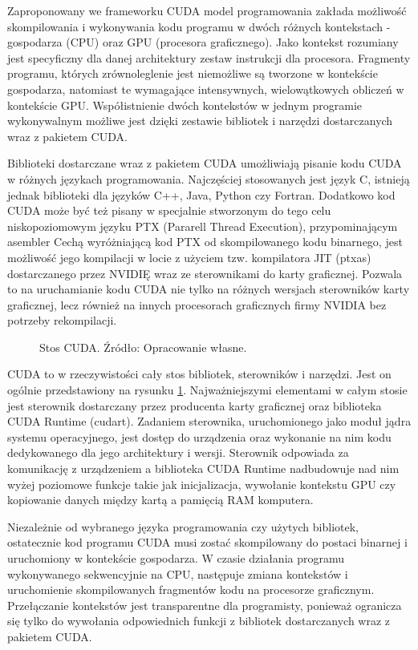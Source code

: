 Zaproponowany we frameworku CUDA model programowania zakłada możliwość
skompilowania i wykonywania kodu programu w dwóch różnych kontekstach -
gospodarza (CPU) oraz GPU (procesora graficznego)\cite{Nvi11b}. Jako kontekst rozumiany jest
specyficzny dla danej architektury zestaw instrukcji dla procesora. Fragmenty
programu, których zrównoleglenie jest niemożliwe są tworzone w kontekście
gospodarza,
	natomiast te wymagające intensywnych, wielowątkowych obliczeń w kontekście
	GPU.  Współistnienie dwóch kontekstów w jednym programie wykonywalnym
	możliwe jest dzięki zestawie bibliotek i narzędzi dostarczanych wraz z
	pakietem CUDA.

Biblioteki dostarczane wraz z pakietem CUDA umożliwiają pisanie kodu CUDA w różnych
językach programowania. Najczęściej stosowanych jest język C, istnieją jednak biblioteki
dla języków C++, Java, Python czy Fortran. Dodatkowo kod CUDA może być też pisany w specjalnie stworzonym do tego celu
niskopoziomowym języku PTX (Pararell Thread Execution), przypominającym
asembler
Cechą wyróżniającą kod PTX od skompilowanego kodu binarnego, jest możliwość jego
kompilacji w locie z użyciem tzw. kompilatora JIT (ptxas) dostarczanego przez
NVIDIĘ wraz ze sterownikami do karty graficznej. Pozwala to na uruchamianie kodu
CUDA nie tylko na różnych wersjach sterowników karty graficznej, lecz również na
innych procesorach graficznych firmy NVIDIA bez potrzeby rekompilacji\cite{isa}.

\begin{figure}[ht]
\centering

\caption{Stos CUDA. Źródło: Opracowanie własne.}
\label{cuda-model}
\end{figure}

CUDA to w rzeczywistości cały stos bibliotek, sterowników i narzędzi. Jest on
ogólnie 
przedstawiony na rysunku \ref{cuda-model}. Najważniejszymi elementami w całym
stosie jest sterownik dostarczany przez producenta karty graficznej
oraz biblioteka CUDA Runtime (cudart). Zadaniem sterownika, uruchomionego
jako moduł jądra systemu operacyjnego, jest dostęp do urządzenia oraz wykonanie
na nim kodu dedykowanego dla jego architektury i wersji. Sterownik odpowiada za
komunikację z urządzeniem a biblioteka CUDA Runtime nadbudowuje nad nim wyżej
poziomowe funkcje takie jak inicjalizacja, wywołanie kontekstu GPU czy
kopiowanie danych między kartą a pamięcią RAM komputera.

Niezależnie od wybranego języka programowania czy użytych bibliotek, ostatecznie kod programu CUDA musi
zostać skompilowany do postaci binarnej i uruchomiony w kontekście gospodarza. W
czasie działania programu wykonywanego sekwencyjnie na CPU, następuje zmiana
kontekstów i uruchomienie skompilowanych fragmentów kodu na procesorze graficznym.
Przełączanie kontekstów jest transparentne dla programisty,
ponieważ ogranicza się tylko do wywołania odpowiednich funkcji z bibliotek
dostarczanych wraz z pakietem CUDA.

